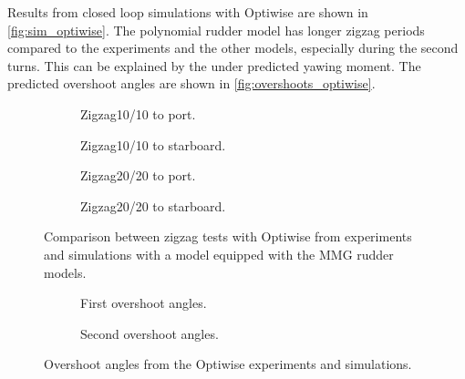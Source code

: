 Results from closed loop simulations with Optiwise are shown in \autoref{fig:sim_optiwise}. The polynomial rudder model has longer zigzag periods compared to the experiments and the other models, especially during the second turns. This can be explained by the under predicted yawing moment. The predicted overshoot angles are shown in \autoref{fig:overshoots_optiwise}.   
\begin{figure}[h]
     \centering
     \begin{subfigure}[b]{0.40\textwidth}
         \centering
         
        \caption{Zigzag10/10 to port.}
        \label{fig:sim_optiwise_10_port}
     \end{subfigure}
     \hfill
     \begin{subfigure}[b]{0.40\textwidth}
         
        \caption{Zigzag10/10 to starboard.}
        \label{fig:sim_optiwise_10_stbd}
     \end{subfigure}
     \vfill
     \begin{subfigure}[b]{0.40\textwidth}
         \centering
         
        \caption{Zigzag20/20 to port.}
        \label{fig:sim_optiwise_20_port}
     \end{subfigure}
     \hfill
     \begin{subfigure}[b]{0.40\textwidth}
         
        \caption{Zigzag20/20 to starboard.}
        \label{fig:sim_optiwise_20_stbd}
     \end{subfigure}
     
        \caption{Comparison between zigzag tests with Optiwise from experiments and simulations with a model equipped with the MMG rudder models.}
        \label{fig:sim_optiwise}
\end{figure}
\begin{figure}[h]
     \centering
     \begin{subfigure}[b]{\textwidth}
         \centering
         
        \caption{First overshoot angles.}
        \label{fig:overhoots1_optiwise}
     \end{subfigure}
     \vfill
     \begin{subfigure}[b]{\textwidth}
         \centering
         
        \caption{Second overshoot angles.}
        \label{fig:overhoots2_optiwise}
     \end{subfigure}
     
        \caption{Overshoot angles from the Optiwise experiments and simulations.}
        \label{fig:overshoots_optiwise}
\end{figure}